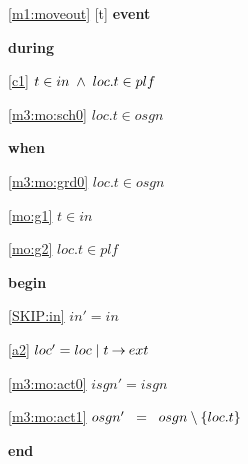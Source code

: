 \noindent \ref{m1:moveout} [t] \textbf{event}
\begin{block}
\item \textbf{during}
\begin{block}
\item[ \eqref{c1} ]$t \in in  %
		\1\land loc.t \in plf $ %
\item[ \eqref{m3:mo:sch0} ]$loc.t \in osgn $ %
\end{block}
\item \textbf{when}
\begin{block}
\item[ \eqref{m3:mo:grd0} ]$loc.t \in osgn $ %
\item[ \eqref{mo:g1} ]$t \in in $ %
\item[ \eqref{mo:g2} ]$loc.t \in plf $ %
\end{block}
\item \textbf{begin}
\begin{block}
\item[ \eqref{SKIP:in} ]$in' = in$ %
\item[ \eqref{a2} ]$loc' = loc \; | \; t \mathbin\rightarrow ext $ %
\item[ \eqref{m3:mo:act0} ]$isgn' = isgn$ %
\item[ \eqref{m3:mo:act1} ]$osgn'  \2 = osgn  %
	\setminus \{ loc.t \} $ %
\end{block}
\item \textbf{end} \\
\end{block}

